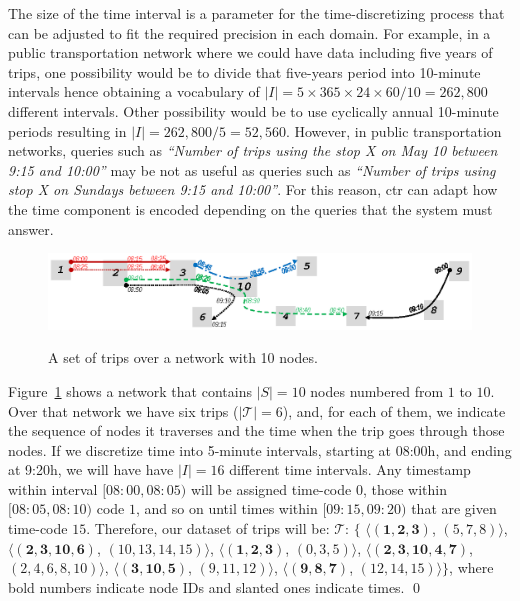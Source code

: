 	The size of the time interval is a parameter for the time-discretizing process
	that can be adjusted to fit the required precision in each domain.
	For example, in a public
	transportation network where we could have data including five years of trips, one
	possibility would be to divide that five-years period into
	10-minute intervals hence obtaining a
	vocabulary of $|I|=5\times 365 \times 24 \times 60/10 = 262,800$ different intervals. 
	Other possibility would
	be to use cyclically annual 10-minute periods resulting in $|I|=262,800 / 5 = 52,560$. 
	However,  in public transportation networks, queries such
	as \textit{``Number of trips using the stop X on May 10 between 9:15 and 10:00''} may be not 
	as useful as queries such as \textit{``Number of trips using stop X on Sundays between 9:15 and
		10:00''}.
	For this reason, \gls{ctr} can adapt how the
	time component is encoded depending on the queries that the system must answer.

	\begin{figure}[ht]
		\begin{center}
			{\includegraphics[width=1\textwidth]{figures/network.eps}}
		\end{center}
		\caption{A set of trips over a network with 10 nodes.}
		\label{fig:network}
	\end{figure}

	\begin{example} \label{exp:ctr}
	Figure~\ref{fig:network} shows a network that contains $|S|=10$ nodes 
	numbered from $1$ to $10$. Over that network we have six trips ($|\mathcal{T}|=6$),
	and, for each of them, we indicate the sequence of nodes it traverses
	and the time when the trip goes through those nodes. If we discretize time into
	5-minute intervals, starting at 08:00h, and ending at 9:20h, we will have
	have $|I|=16$ different time intervals. Any timestamp within
	interval $\mathit{[08\!:\!00,08\!:\!05)}$ will
	be assigned time-code $0$, those within $\mathit{[08\!:\!05,08\!:\!10)}$ code $1$, and so on until
	times within $\mathit{[09\!:\!15,09\!:\!20)}$ that are given time-code $15$.  
	Therefore, our dataset of trips will be: 
	$\mathcal{T}$: $\{$%
	$\langle (\mathbf{1,2,3     })$, $(\mathit{5,7,8})                     \rangle$, 
	$\langle (\mathbf{2,3,10,6  })$, $(\mathit{10,13,14,15})           \rangle$, 
	$\langle (\mathbf{1,2,3     })$, $(\mathit{0,3,5})                     \rangle$, 
	$\langle (\mathbf{2,3,10,4,7})$, $(\mathit{2,4,6,8,10}) \rangle$, 
	$\langle (\mathbf{3,10,5    })$, $(\mathit{9,11,12})                     \rangle$, 
	$\langle (\mathbf{9,8,7     })$, $(\mathit{12,14,15})                    \rangle$$\}$, 
	where bold numbers indicate node IDs and slanted ones indicate times. \qed
	\end{example}

